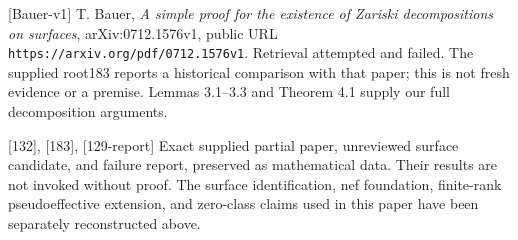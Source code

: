 \documentclass[
  10pt,
]{article}
\begin{document}
{[}Bauer-v1{]} T. Bauer, \emph{A simple proof for the existence of
Zariski decompositions on surfaces}, arXiv:0712.1576v1, public URL
\texttt{https://arxiv.org/pdf/0712.1576v1}. Retrieval attempted and
failed. The supplied root183 reports a historical comparison with that
paper; this is not fresh evidence or a premise. Lemmas 3.1--3.3 and
Theorem 4.1 supply our full decomposition arguments.

{[}132{]}, {[}183{]}, {[}129-report{]} Exact supplied partial paper,
unreviewed surface candidate, and failure report, preserved as
mathematical data. Their results are not invoked without proof. The
surface identification, nef foundation, finite-rank pseudoeffective
extension, and zero-class claims used in this paper have been separately
reconstructed above.
\end{document}
